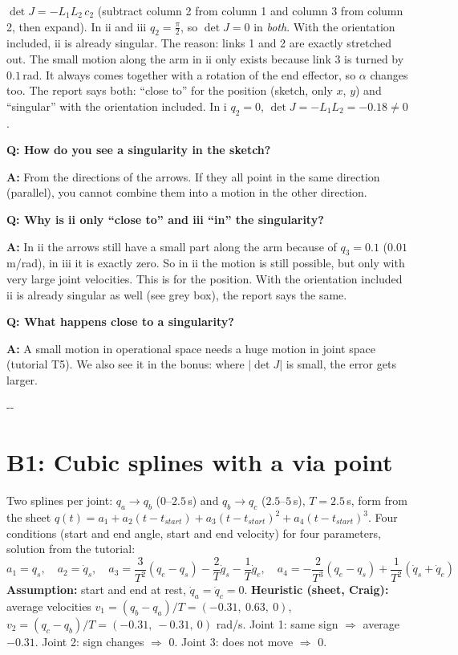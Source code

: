 \documentclass[10pt,a4paper]{article}
\makeatletter
\newcommand{\secneed}[1]{\par\penalty\@M\begingroup\setlength{\dimen@}{#1}\dimen@ii\pagegoal
  \advance\dimen@ii-\pagetotal\ifdim\dimen@>\dimen@ii\ifdim\dimen@ii>\z@\vfil\fi\penalty-\@M\fi\endgroup}
\let\oldsection\section
\renewcommand{\section}{\secneed{9\baselineskip}\oldsection}
\newcommand{\frage}[2]{\textbf{Q: #1}\par\nopagebreak\vspace{1pt}\textbf{A:} #2\par\vspace{5pt}}
\makeatother
\begin{document}
\begin{extra}
$\det J = -L_1 L_2\, c_2$ (subtract column 2 from column 1 and column 3 from column 2, then expand). In ii and iii
$q_2 = \frac{\pi}{2}$, so $\det J = 0$ in \emph{both}. With the orientation included, ii is already singular. The reason:
links 1 and 2 are exactly stretched out. The small motion along the arm in ii only exists because link 3 is turned by $0.1$\,rad. It always comes together with a rotation of the end effector, so $\alpha$ changes too.
The report says both: ``close to'' for the position (sketch, only $x$, $y$) and ``singular'' with the orientation included. In i $q_2 = 0$, $\det J = -L_1 L_2 = -0.18 \ne 0$.
\end{extra}

\begin{fragen}
\frage{How do you see a singularity in the sketch?}
{From the directions of the arrows. If they all point in the same direction (parallel), you cannot combine them into a
motion in the other direction.}
\frage{Why is ii only ``close to'' and iii ``in'' the singularity?}
{In ii the arrows still have a small part along the arm because of $q_3 = 0.1$ ($0.01$\,m/rad), in iii it is exactly zero.
So in ii the motion is still possible, but only with very large joint velocities. This is for the position. With the orientation included ii is already singular as well (see grey box), the report says the same.}
\frage{What happens close to a singularity?}
{A small motion in operational space needs a huge motion in joint space (tutorial T5). We also see it in the bonus: where
$|\det J|$ is small, the error gets larger.}
\end{fragen}

\section{B1: Cubic splines with a via point}

Two splines per joint: $q_a \to q_b$ ($0$--$2.5$\,s) and $q_b \to q_c$ ($2.5$--$5$\,s), $T = 2.5$\,s, form from the sheet
$q(t) = a_1 + a_2 (t - t_{start}) + a_3 (t - t_{start})^2 + a_4 (t - t_{start})^3$. Four conditions (start and end angle,
start and end velocity) for four parameters, solution from the tutorial:
\[
  a_1 = q_s,\quad a_2 = \dot q_s,\quad
  a_3 = \frac{3}{T^2}(q_e - q_s) - \frac{2}{T}\dot q_s - \frac{1}{T}\dot q_e,\quad
  a_4 = -\frac{2}{T^3}(q_e - q_s) + \frac{1}{T^2}(\dot q_s + \dot q_e)
\]
\textbf{Assumption:} start and end at rest, $\dot q_a = \dot q_c = 0$. \textbf{Heuristic (sheet, Craig):} average
velocities $v_1 = (q_b - q_a)/T = (-0.31,\ 0.63,\ 0)$, $v_2 = (q_c - q_b)/T = (-0.31,\ -0.31,\ 0)$ rad/s.
Joint 1: same sign $\Rightarrow$ average $-0.31$. Joint 2: sign changes $\Rightarrow$ 0. Joint 3: does not move
$\Rightarrow$ 0.
\end{document}
